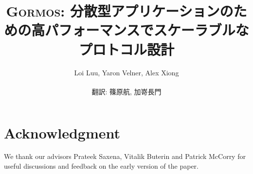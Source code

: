 \documentclass{styles/llncs}
\newcommand{\codename}{{\scshape Gormos}\xspace}
\begin{document}
\title{
  \codename: 分散型アプリケーションのための高パフォーマンスでスケーラブルなプロトコル設計
}
\author{
    Loi Luu, Yaron Velner, Alex Xiong\\
    \\
    \vspace{10pt}
    翻訳: 篠原航, 加嵜長門\\
}


{\def\addcontentsline#1#2#3{}\maketitle}


\setcounter{tocdepth}{2}
\tableofcontents
\newpage



\section{Acknowledgment}
We thank our advisors Prateek Saxena, Vitalik Buterin and Patrick McCorry for useful discussions and feedback on the early version of
the paper.





% 
\end{document}
